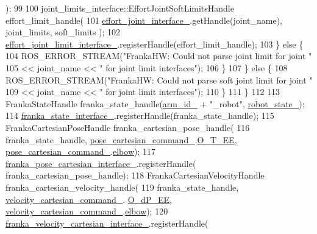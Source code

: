 \begin{DoxyCode}
      );
99 
100         joint\_limits\_interface::EffortJointSoftLimitsHandle effort\_limit\_handle(
101             \hyperlink{classfranka__hw_1_1FrankaHW_a5f695d0eb767c02397372cb5536db00c}{effort\_joint\_interface\_}.getHandle(joint\_name), joint\_limits, soft\_limits
      );
102         \hyperlink{classfranka__hw_1_1FrankaHW_a3545598adde92a2cd78af121bf40f24b}{effort\_joint\_limit\_interface\_}.registerHandle(effort\_limit\_handle);
103       \} \textcolor{keywordflow}{else} \{
104         ROS\_ERROR\_STREAM(\textcolor{stringliteral}{"FrankaHW: Could not parse joint limit for joint "}
105                          << joint\_name << \textcolor{stringliteral}{" for joint limit interfaces"});
106       \}
107     \} \textcolor{keywordflow}{else} \{
108       ROS\_ERROR\_STREAM(\textcolor{stringliteral}{"FrankaHW: Could not parse soft joint limit for joint "}
109                        << joint\_name << \textcolor{stringliteral}{" for joint limit interfaces"});
110     \}
111   \}
112 
113   FrankaStateHandle franka\_state\_handle(\hyperlink{classfranka__hw_1_1FrankaHW_acb16f326973e2eb1c33c28f71492d7d5}{arm\_id\_} + \textcolor{stringliteral}{"\_robot"}, \hyperlink{classfranka__hw_1_1FrankaHW_a1b9c3149cda8b7d78d52ecea65a8ebab}{robot\_state\_});
114   \hyperlink{classfranka__hw_1_1FrankaHW_ac14c76285bdd23c99a2dc60b09c862cc}{franka\_state\_interface\_}.registerHandle(franka\_state\_handle);
115   FrankaCartesianPoseHandle franka\_cartesian\_pose\_handle(
116       franka\_state\_handle, \hyperlink{classfranka__hw_1_1FrankaHW_a28885bdd6202f0efbe793725e5d2497b}{pose\_cartesian\_command\_}.\hyperlink{classfranka_1_1CartesianPose_a406e53e3d8fe594a11888f516eb4bf7d}{O\_T\_EE}, 
      \hyperlink{classfranka__hw_1_1FrankaHW_a28885bdd6202f0efbe793725e5d2497b}{pose\_cartesian\_command\_}.\hyperlink{classfranka_1_1CartesianPose_abef660743df9cf94d11c556d9c3d25be}{elbow});
117   \hyperlink{classfranka__hw_1_1FrankaHW_ad64e463f182494a979b27f03fd1ecaee}{franka\_pose\_cartesian\_interface\_}.registerHandle(
      franka\_cartesian\_pose\_handle);
118   FrankaCartesianVelocityHandle franka\_cartesian\_velocity\_handle(
119       franka\_state\_handle, \hyperlink{classfranka__hw_1_1FrankaHW_aaa601f471de0a83874ba1f9de038eb30}{velocity\_cartesian\_command\_}.
      \hyperlink{classfranka_1_1CartesianVelocities_ab7a42c7c1ee7109025aff5c43a56b398}{O\_dP\_EE}, \hyperlink{classfranka__hw_1_1FrankaHW_aaa601f471de0a83874ba1f9de038eb30}{velocity\_cartesian\_command\_}.\hyperlink{classfranka_1_1CartesianVelocities_a6419df1399d3dfab79b1654b94ced344}{elbow});
120   \hyperlink{classfranka__hw_1_1FrankaHW_a4844a25f394fcd8f382d1af741dc32e8}{franka\_velocity\_cartesian\_interface\_}.registerHandle(

\end{DoxyCode}
